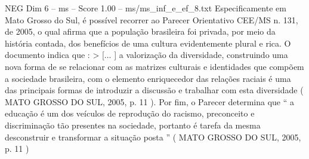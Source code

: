 \begin{textsample}{NEG Dim 6 – ms – Score 1.00 – ms/ms\_inf\_e\_ef\_8.txt}
Especificamente em Mato Grosso do Sul, é possível recorrer ao Parecer Orientativo CEE/MS n. 131, de 2005, o qual afirma que a população brasileira foi privada, por meio da história contada, dos benefícios de uma cultura evidentemente plural e rica.
O documento indica que : > [... ] a valorização da diversidade, construindo uma nova forma de se relacionar com as matrizes culturais e identidades que compõem a sociedade brasileira, com o elemento enriquecedor das relações raciais é uma das principais formas de introduzir a discussão e trabalhar com esta diversidade ( MATO GROSSO DO SUL, 2005, p. 11 ).
Por fim, o Parecer determina que “ a educação é um dos veículos de reprodução do racismo, preconceito e discriminação tão presentes na sociedade, portanto é tarefa da mesma desconstruir e transformar a situação posta ” ( MATO GROSSO DO SUL, 2005, p. 11 )

\end{textsample}
